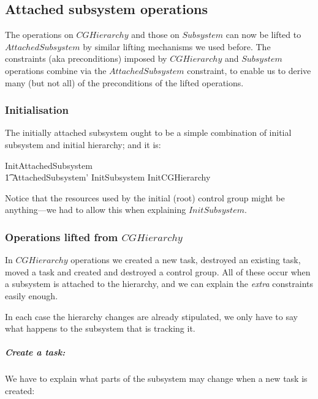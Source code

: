 \documentclass[a4paper,twoside,12pt]{article}
\begin{document}
\subsection{Attached subsystem operations}
The operations on $CGHierarchy$ and those on $Subsystem$ can now be lifted to $AttachedSubsystem$
by similar lifting mechanisms we used before. The constraints (aka preconditions) imposed
by $CGHierarchy$ and $Subsystem$ operations combine via the
$AttachedSubsystem$ constraint, to enable us to derive many (but not all) of the preconditions of the lifted operations.

\subsubsection{Initialisation}

The initially attached subsystem ought to be a simple combination of initial subsystem and initial hierarchy; and it is:

\begin{zed}
InitAttachedSubsystem  \\
\t1 AttachedSubsystem' \land InitSubsystem \land InitCGHierarchy
\end{zed}
Notice that the resources used by the initial (root) control group might be anything---we had to allow this when
explaining $InitSubsystem$.

\subsubsection{Operations lifted from $CGHierarchy$}

In $CGHierarchy$ operations we created a new task, destroyed an existing task, moved a task and created and destroyed
a control group.  All of these occur when a subsystem is attached to the hierarchy, and we can explain the \emph{extra}
constraints easily enough.

In each case the hierarchy changes are already stipulated, we only have to say what happens to the subsystem that is
tracking it.

\subparagraph{Create a task:}
We have to explain what parts of the subsystem may change when a new task is created:
\end{document}
